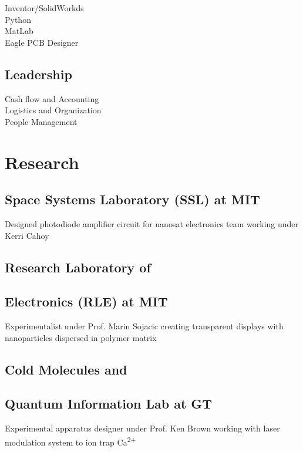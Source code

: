 \documentclass[letterpaper, article]{deedy-resume-openfont}
\begin{document}
\begin{minipage}[t]{0.33\textwidth}
Inventor/SolidWorkds \hspace{.27cm} \textbullet \textbullet  \textbullet \\
Python \hspace{2.5cm} \textbullet \textbullet \textbullet  \textbullet\\
MatLab \hspace{2.42cm} \textbullet \textbullet \textbullet \textbullet  \textbullet\\ 
Eagle PCB Designer \hspace{.58cm} \textbullet \textbullet \textbullet \textbullet  \textbullet \\
\sectionsep

\subsection{Leadership}
Cash flow and Accounting \hspace{.55cm} \textbullet \textbullet \textbullet  \textbullet\\
Logistics and Organization \hspace{.5cm} \textbullet \textbullet  \textbullet \\
People Management \hspace{1.38cm} \textbullet \textbullet \textbullet \textbullet  \textbullet


\section{Research} 
\subsection{Space Systems Laboratory (SSL) at MIT \hfill}
Designed photodiode amplifier circuit for nanosat electronics team working under Kerri Cahoy 
\sectionsep
\subsection{Research Laboratory of \hfill}
\subsection{Electronics (RLE) at MIT \hfill} 
Experimentalist under Prof. Marin Sojacic creating transparent displays with nanoparticles dispersed in polymer matrix
\sectionsep
\subsection{Cold Molecules and \hfill}
\subsection{Quantum Information \hfill Lab at GT \hfill}
Experimental apparatus designer under Prof. Ken Brown working with laser modulation system to ion trap Ca\textsuperscript{2+}



\end{minipage} 
\end{document}
